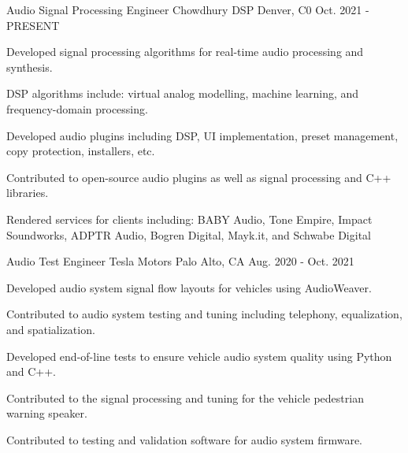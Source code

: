 

\begin{cventries}

  \cventry
    {Audio Signal Processing Engineer} %
    {Chowdhury DSP} %
    {Denver, C0} %
    {Oct. 2021 - PRESENT} %
    {
      \begin{cvitems} %
        \item {Developed signal processing algorithms for real-time audio processing and synthesis.}
        \item {DSP algorithms include: virtual analog modelling, machine learning, and frequency-domain processing.}
        \item {Developed audio plugins including DSP, UI implementation, preset management, copy protection, installers, etc.}
        \item {Contributed to open-source audio plugins as well as signal processing and C++ libraries.}
        \item {Rendered services for clients including: BABY Audio, Tone Empire, Impact Soundworks, ADPTR Audio, Bogren Digital, Mayk.it, and Schwabe Digital}
      \end{cvitems}
    }

  \cventry
    {Audio Test Engineer} %
    {Tesla Motors} %
    {Palo Alto, CA} %
    {Aug. 2020 - Oct. 2021} %
    {
      \begin{cvitems} %
        \item {Developed audio system signal flow layouts for vehicles using AudioWeaver.}
        \item {Contributed to audio system testing and tuning including telephony, equalization, and spatialization.}
        \item {Developed end-of-line tests to ensure vehicle audio system quality using Python and C++.}
        \item {Contributed to the signal processing and tuning for the vehicle pedestrian warning speaker.}
        \item {Contributed to testing and validation software for audio system firmware.}
      \end{cvitems}
    }


\end{cventries}
